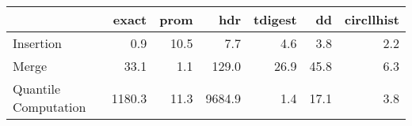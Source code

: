 \begin{tabular}{lrrrrrr}
\toprule
{} &  exact &  prom &    hdr &  tdigest &   dd &  circllhist \\
\midrule
Insertion            &    0.9 &  10.5 &    7.7 &      4.6 &  3.8 &         2.2 \\
Merge                &   33.1 &   1.1 &  129.0 &     26.9 & 45.8 &         6.3 \\
Quantile Computation & 1180.3 &  11.3 & 9684.9 &      1.4 & 17.1 &         3.8 \\
\bottomrule
\end{tabular}
